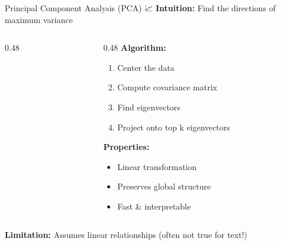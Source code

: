 \documentclass[aspectratio=169]{beamer}
\begin{document}
\begin{frame}[shrink=10]{Principal Component Analysis (PCA) 📈}
\textbf{Intuition:} Find the directions of maximum variance

\vspace{1em}

\begin{columns}[T]
\begin{column}{0.48\textwidth}
\begin{center}
\end{center}
\end{column}

\begin{column}{0.48\textwidth}
\textbf{Algorithm:}
\begin{enumerate}\setlength{\itemsep}{0pt}
    \item Center the data
    \item Compute covariance matrix
    \item Find eigenvectors
    \item Project onto top k eigenvectors
\end{enumerate}

\vspace{0.5em}
\textbf{Properties:}
\begin{itemize}\setlength{\itemsep}{0pt}
    \item Linear transformation
    \item Preserves global structure
    \item Fast \& interpretable
\end{itemize}
\end{column}
\end{columns}

\vspace{1em}
\textbf{Limitation:} Assumes linear relationships (often not true for text!)
\end{frame}
\end{document}
